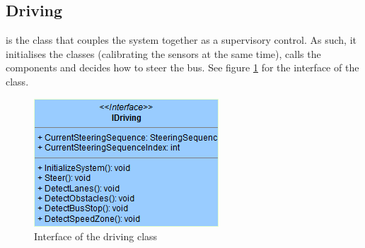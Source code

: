 
\subsection{Driving}
 is the class that couples the system together as a supervisory control. As such, it initialises the classes (calibrating the sensors at the same time), calls the components and decides how to steer the bus. See figure \ref{fig:interfaceDriving} for the interface of the  class.

\begin{figure}[ht]
\begin{centering}
    \includegraphics[scale=0.8]{Images/Design/interfaceDriving.png}
    \caption{Interface of the driving class}
    \label{fig:interfaceDriving}
    \end{centering}
\end{figure}



